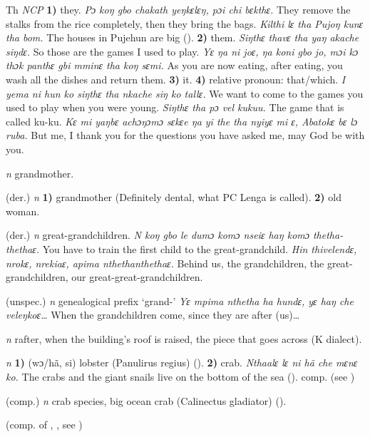 \newpage
\begin{letter}{Th}
 \textit{NCP} \textbf{1)} they. \textit{Pɔ koŋ gbo chakath yeŋkɛlɛŋ, pɔi chi bɛkthɛ.} They remove the stalks from the rice completely, then they bring the bags. \textit{Kilthi lɛ tha Pujoŋ kunɛ tha bom.} The houses in Pujehun are big (\citealt{Pichl1967}). \textbf{2)} them. \textit{Siŋthɛ thavɛ tha yaŋ akache siŋdɛ.} So those are the games I used to play. \textit{Yɛ ŋa ni joɛ, ŋa koni gbo jo, mɔi kɔ thɔk panthɛ gbi mminɛ tha koŋ sɛmi.} As you are now eating, after eating, you wash all the dishes and return them. \textbf{3)} it. \textbf{4)} relative pronoun: that/which. \textit{I yema ni hun ko siŋthɛ tha nkache siŋ ko tallɛ.} We want to come to the games you used to play when you were young. \textit{Siŋthɛ tha pɔ vel kukuu.} The game that is called ku-ku. \textit{Kɛ mi yaŋbɛ achɔŋɔmɔ sɛkɛe ŋa yi the tha nyiyɛ mi ɛ, Abatokɛ bɛ lɔ ruba.} But me, I thank you for the questions you have asked me, may God be with you.

 \textit{n} grandmother.

 (der.) \textit{n} \textbf{1)} grandmother (Definitely dental, what PC Lenga is called). \textbf{2)} old woman.

 (der.) \textit{n} great-grandchildren. \textit{N koŋ gbo le dumɔ komɔ nseiɛ haŋ komɔ thetha-thethaɛ.} You have to train the first child to the great-grandchild. \textit{Hin thivelendɛ, nrokɛ, nrekiaɛ, apima nthethanthethaɛ.} Behind us, the grandchildren, the great-grandchildren, our great-great-grandchildren. 

 (unspec.) \textit{n} genealogical prefix ‘grand-' \textit{Yɛ mpima nthetha ha hundɛ, yɛ haŋ che veleŋkoɛ…} When the grandchildren come, since they are after (us)…

 \textit{n} rafter, when the building's roof is raised, the piece that goes across (K dialect). 

 \textit{n} \textbf{1)} (wɔ/hã, si) lobster (Panulirus regius) (\citealt{Pichl1967}). \textbf{2)} crab. \textit{Nthaalɛ lɛ ni hã che mɛnɛ ko.} The crabs and the giant snails live on the bottom of the sea (\citealt{Pichl1967}). comp.  (see ) 

 (comp.) \textit{n} crab species, big ocean crab (Calinectus gladiator) (\citealt{Pichl1967}). 

 (comp. of , , see ) 


\end{letter}
